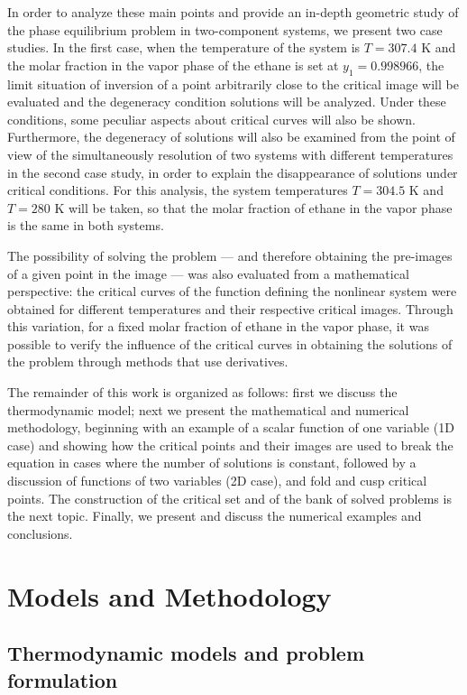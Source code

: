 \documentclass[journal=iecred,manuscript=article]{achemso}
\theoremstyle{definition}
\theoremstyle{remark}
\begin{document}
In order to analyze these main points and provide an in-depth geometric study of the phase equilibrium problem in two-component systems, we present two case studies. In the first case, when the temperature of the system is $ T = 307.4 $ K and the molar fraction in the vapor phase of the ethane is set at $ y_{1} = 0.998966 $, the limit situation of inversion of a point arbitrarily close to the critical image will be evaluated and the degeneracy condition solutions will be analyzed. Under these conditions, some peculiar aspects about critical curves will also be shown. Furthermore, the degeneracy of solutions will also be examined from the point of view of the simultaneously resolution of two systems with different temperatures in the second case study, in order to explain the disappearance of solutions under critical conditions. For this analysis, the system temperatures $ T = 304.5 $ K and $ T = 280 $ K will be taken, so that the molar fraction of ethane in the vapor phase is the same in both systems.

The possibility of solving the problem --- and therefore obtaining the pre-images of a given point in the image --- was also evaluated from a mathematical perspective: the critical curves of the function defining  the nonlinear system were obtained for different temperatures and their respective critical images. Through this variation, for a fixed molar fraction of ethane in the vapor phase, it was possible to verify the influence of the critical curves in obtaining the solutions of the problem through methods that use derivatives.

The remainder of this work is organized as follows: first we discuss the thermodynamic model; next we present the mathematical and numerical methodology, beginning with an example of a scalar function of one variable (1D case) and showing how the critical points and their images are used to break the equation in cases where the number of solutions is constant, followed by  a discussion of functions of two variables (2D case), and fold and cusp critical points. The construction of the critical set and of the bank of solved problems is the next topic. Finally, we present and discuss the numerical examples and conclusions.

\section{Models and Methodology}

\subsection{Thermodynamic models and problem formulation}
\end{document}
